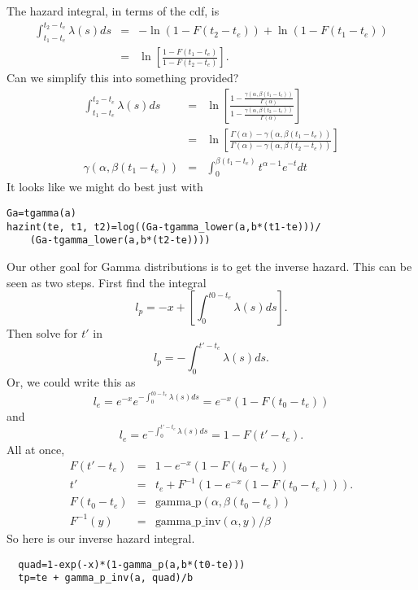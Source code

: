 \documentclass{article}
\begin{document}
The hazard integral, in terms of the cdf, is
\begin{eqnarray}
 \int_{t_1-t_e}^{t_2-t_e}\lambda(s)ds&=&-\ln(1-F(t_2-t_e))+\ln(1-F(t_1-t_e)) \\
 &=& \ln\left[\frac{1-F(t_1-t_e)}{1-F(t_2-t_e)}\right].
\end{eqnarray}
Can we simplify this into something provided?
\begin{eqnarray}
\int_{t_1-t_e}^{t_2-t_e}\lambda(s)ds & = & \ln\left[\frac{1-\frac{\gamma(\alpha,\beta (t_1-t_e))}{\Gamma(\alpha)}}{1-\frac{\gamma(\alpha,\beta (t_2-t_e))}{\Gamma(\alpha)}}\right] \\
 & = & \ln\left[\frac{\Gamma(\alpha)-\gamma(\alpha,\beta (t_1-t_e))}
 {\Gamma(\alpha)-\gamma(\alpha,\beta (t_2-t_e))} \right] \\
\gamma(\alpha,\beta (t_1-t_e)) & = & \int_0^{\beta(t_1-t_e)} t^{\alpha-1}e^{-t}dt
\end{eqnarray}
It looks like we might do best just with
\begin{lstlisting}
Ga=tgamma(a)
hazint(te, t1, t2)=log((Ga-tgamma_lower(a,b*(t1-te)))/
    (Ga-tgamma_lower(a,b*(t2-te))))
\end{lstlisting}

Our other goal for Gamma distributions is to get the inverse hazard.
This can be seen as two steps. First find the integral
\begin{equation}
  l_p=-x+\left[\int_0^{t0-t_e}\lambda(s)ds\right].
\end{equation}
Then solve for $t'$ in
\begin{equation}
  l_p=-\int_0^{t'-t_e}\lambda(s)ds.
\end{equation}
Or, we could write this as
\begin{equation}
  l_e =e^{-x}e^{-\int_0^{t0-t_e}\lambda(s)ds}=e^{-x}(1-F(t_0-t_e))
\end{equation}
and
\begin{equation}
  l_e=e^{-\int_0^{t'-t_e}\lambda(s)ds}=1-F(t'-t_e).
\end{equation}
All at once,
\begin{eqnarray}
  F(t'-t_e)&=&1-e^{-x}(1-F(t_0-t_e)) \\
 t'&=&t_e+F^{-1}\left(1-e^{-x}(1-F(t_0-t_e))\right). \\
 F(t_0-t_e)&=&\mbox{gamma\_p}(\alpha,\beta(t_0-t_e)) \\
 F^{-1}(y)&=&\mbox{gamma\_p\_inv}(\alpha, y)/\beta
\end{eqnarray}
So here is our inverse hazard integral.
\begin{lstlisting}
  quad=1-exp(-x)*(1-gamma_p(a,b*(t0-te)))
  tp=te + gamma_p_inv(a, quad)/b
\end{lstlisting}
\end{document}
